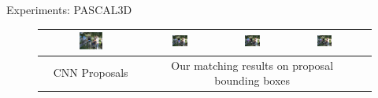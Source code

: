 \documentclass[serif,mathserif,final]{beamer}
\newcommand{\1}{\mathbb{I}} %
\begin{document}
\begin{frame}{}
\begin{columns}[t]
\begin{column}{0.39\linewidth}
\begin{block}{Experiments: PASCAL3D}
\begin{figure}
\begin{tabular}{|c|c|c|c|c|}
          \hline
          \includegraphics[width=0.24\textwidth]{bicycle_cnn/4a.png} &   
          \includegraphics[width=0.24\textwidth]{bicycle_cnn/4b.png} &   
          \includegraphics[width=0.24\textwidth]{bicycle_cnn/4c.png} &   
          \includegraphics[width=0.24\textwidth]{bicycle_cnn/4d.png}  \\
          \hline
          CNN Proposals & \multicolumn{3}{|c|}{Our matching results on proposal bounding boxes} \\
          \hline
        \end{tabular}
        \end{figure}
        \vspace{-1.0em}
      \end{block}


    \end{column}
  \end{columns}
\end{frame}
\end{document}
